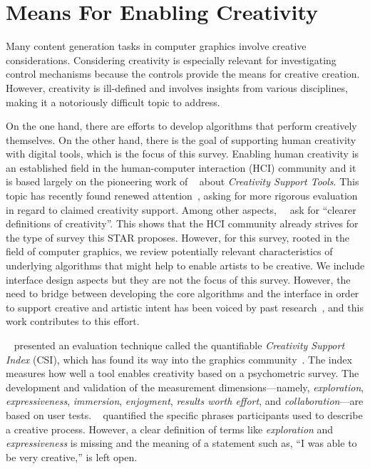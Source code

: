 

\section{Means For Enabling Creativity}\label{sec:creativ_means}

Many content generation tasks in computer graphics involve creative considerations. Considering creativity is especially relevant for investigating control mechanisms because the controls provide the means for creative creation. However, creativity is ill-defined and involves insights from various disciplines, making it a notoriously difficult topic to address.

On the one hand, there are efforts to develop algorithms that perform creatively themselves. On the other hand, there is the goal of supporting human creativity with digital tools, which is the focus of this survey. Enabling human creativity is an established field in the human-computer interaction (HCI) community and it is based largely on the pioneering work of \citeauthor*{shneiderman_2007_cst}~\cite{shneiderman_2007_cst} about \textit{Creativity Support Tools}. This topic has recently found renewed attention~\cite{frich_2018_tyo, frich_2019_mtl, remy_2020_ecs}, asking for more rigorous evaluation in regard to claimed creativity support. Among other aspects,~\citeauthor*{frich_2018_tyo}~\cite{frich_2018_tyo} ask for ``clearer definitions of creativity''. This shows that the HCI community already strives for the type of survey this STAR proposes. However, for this survey, rooted in the field of computer graphics, we review potentially relevant characteristics of underlying algorithms that might help to enable artists to be creative. We include interface design aspects but they are not the focus of this survey. However, the need to bridge between developing the core algorithms and the interface in order to support creative and artistic intent has been voiced by past research~\cite{deterding_2017_mci,isenberg_2016_inw, salesin_2002_nar}, and this work contributes to this effort.

\citeauthor*{cherry_2014_qcs}~\cite{cherry_2014_qcs} presented an evaluation technique called the quantifiable \textit{Creativity Support Index} (CSI), which has found its way into the graphics community~\cite{shugrina_2017_ppi}. The index measures how well a tool enables creativity based on a psychometric survey. The development and validation of the measurement dimensions---namely, \textit{exploration}, \textit{expressiveness}, \textit{immersion}, \textit{enjoyment}, \textit{results worth effort}, and \textit{collaboration}---are based on user tests. \citeauthor*{cherry_2014_qcs}~\cite{cherry_2014_qcs} quantified the specific phrases participants used to describe a creative process. However, a clear definition of terms like \textit{exploration} and \textit{expressiveness} is missing and the meaning of a statement such as, ``I was able to be very creative,'' is left open. 

